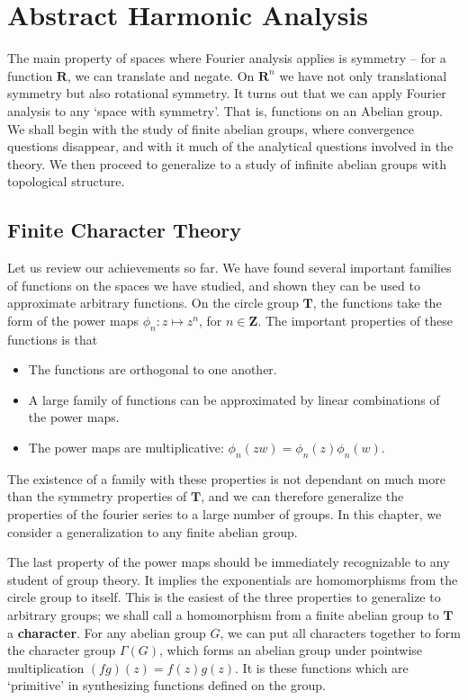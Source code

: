 \part{Abstract Harmonic Analysis}

The main property of spaces where Fourier analysis applies is symmetry -- for a function $\mathbf{R}$, we can translate and negate. On $\mathbf{R}^n$ we have not only translational symmetry but also rotational symmetry. It turns out that we can apply Fourier analysis to any `space with symmetry'. That is, functions on an Abelian group. We shall begin with the study of finite abelian groups, where convergence questions disappear, and with it much of the analytical questions involved in the theory. We then proceed to generalize to a study of infinite abelian groups with topological structure.


\chapter{Finite Character Theory}

Let us review our achievements so far. We have found several important families of functions on the spaces we have studied, and shown they can be used to approximate arbitrary functions. On the circle group $\mathbf{T}$, the functions take the form of the power maps $\phi_n: z \mapsto z^n$, for $n \in \mathbf{Z}$. The important properties of these functions is that
%
\begin{itemize}
    \item The functions are orthogonal to one another.
    \item A large family of functions can be approximated by linear combinations of the power maps.
    \item The power maps are multiplicative: $\phi_n(zw) = \phi_n(z) \phi_n(w)$.
\end{itemize}
%
The existence of a family with these properties is not dependant on much more than the symmetry properties of $\mathbf{T}$, and we can therefore generalize the properties of the fourier series to a large number of groups. In this chapter, we consider a generalization to any finite abelian group.

The last property of the power maps should be immediately recognizable to any student of group theory. It implies the exponentials are homomorphisms from the circle group to itself. This is the easiest of the three properties to generalize to arbitrary groups; we shall call a homomorphism from a finite abelian group to $\mathbf{T}$ a {\bf character}. For any abelian group $G$, we can put all characters together to form the character group $\Gamma(G)$, which forms an abelian group under pointwise multiplication $(fg)(z) = f(z)g(z)$. It is these functions which are `primitive' in synthesizing functions defined on the group.


